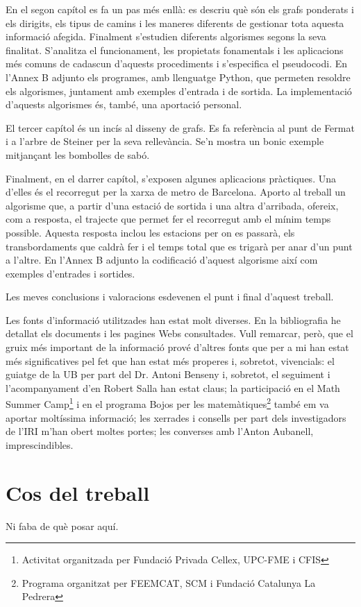 \documentclass[a4, 12pt, catalan]{report}
\newcounter{propietat}[subsection]
\begin{document}
En el segon capítol es fa un pas més enllà: es descriu què són els grafs ponderats i els dirigits, els tipus de camins i les maneres diferents de gestionar tota aquesta informació afegida. Finalment s'estudien diferents algorismes segons la seva finalitat. S'analitza el funcionament, les propietats fonamentals i les aplicacions més comuns de cadascun d'aquests procediments i s'especifica el pseudocodi. En l'Annex B adjunto els programes, amb llenguatge Python, que permeten resoldre els algorismes, juntament amb exemples d'entrada i de sortida. La implementació d'aquests algorismes és, també, una aportació personal.

El tercer capítol és un incís al disseny de grafs. Es fa referència al punt de Fermat i a l'arbre de Steiner per la seva rellevància. Se'n mostra un bonic exemple mitjançant les bombolles de sabó.

Finalment, en el darrer capítol, s'exposen algunes aplicacions pràctiques. Una d'elles és el recorregut per la xarxa de metro de Barcelona. Aporto al treball un algorisme que, a partir d'una estació de sortida i una altra d'arribada, ofereix, com a resposta, el trajecte que permet fer el recorregut amb el mínim temps possible. Aquesta resposta inclou les estacions per on es passarà, els transbordaments que caldrà fer i el temps total que es trigarà per anar d'un punt a l'altre. En l'Annex B adjunto la codificació d'aquest algorisme així com exemples d'entrades i sortides. 

Les meves conclusions i valoracions esdevenen el punt i final d'aquest treball. 

Les fonts d'informació utilitzades han estat molt diverses. En la bibliografia he detallat els documents i les pagines Webs consultades. Vull remarcar, però, que el gruix més important de la informació prové d'altres fonts que per a mi han estat més significatives pel fet que han estat més properes i, sobretot, vivencials: el guiatge de la UB per part del Dr. Antoni Benseny i, sobretot, el seguiment i l'acompanyament d'en Robert Salla han estat claus; la participació en el Math Summer Camp\footnote{Activitat organitzada per Fundació Privada Cellex, UPC-FME i CFIS} i en el programa Bojos per les matemàtiques\footnote{Programa organitzat per FEEMCAT, SCM i Fundació Catalunya La Pedrera} també em va aportar moltíssima informació; les xerrades i consells per part dels investigadors de l'IRI m'han obert moltes portes; les converses amb l'Anton Aubanell, imprescindibles. 

\section*{Cos del treball}
Ni faba de què posar aquí.
\end{document}
